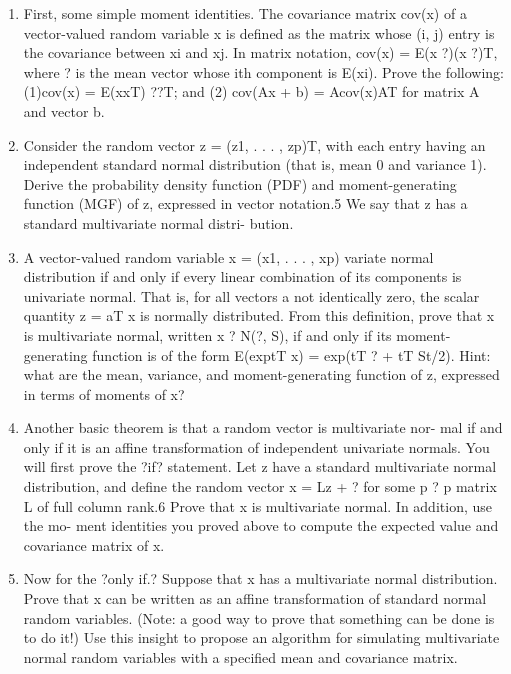 \documentclass{homework}
\begin{document}
\begin{enumerate}[label=(\Alph*)]
\item First, some simple moment identities. The covariance matrix cov(x) of a vector-valued random variable x is defined as the matrix whose (i, j) entry is the covariance between xi and xj. In matrix notation, cov(x) = E{(x   ?)(x   ?)T}, where ? is the mean vector whose ith component is E(xi). Prove the following: (1)cov(x) = E(xxT)   ??T; and (2) cov(Ax + b) = Acov(x)AT for matrix A and vector b.

\item Consider the random vector z = (z1, . . . , zp)T, with each entry having an independent standard normal distribution (that is, mean 0 and variance 1). Derive the probability density function (PDF) and moment-generating function (MGF) of z, expressed in vector notation.5 We say that z has a standard multivariate normal distri- bution.

\item A vector-valued random variable x = (x1, . . . , xp)
variate normal distribution if and only if every linear combination of its components is univariate normal. That is, for all vectors a not identically zero, the scalar quantity z = aT x is normally distributed. From this definition, prove that x is multivariate normal, written
x ? N(?, S), if and only if its moment-generating function is of the form E(exp{tT x}) = exp(tT ? + tT St/2). Hint: what are the mean, variance, and moment-generating function of z, expressed in terms of moments of x?

\item Another basic theorem is that a random vector is multivariate nor- mal if and only if it is an affine transformation of independent univariate normals. You will first prove the ?if? statement. Let z have a standard multivariate normal distribution, and define the random vector x = Lz + ? for some p ? p matrix L of full column rank.6 Prove that x is multivariate normal. In addition, use the mo- ment identities you proved above to compute the expected value and covariance matrix of x.

\item Now for the ?only if.? Suppose that x has a multivariate normal distribution. Prove that x can be written as an affine transformation of standard normal random variables. (Note: a good way to prove that something can be done is to do it!) Use this insight to propose an algorithm for simulating multivariate normal random variables with a specified mean and covariance matrix.


\end{enumerate}
\end{document}
